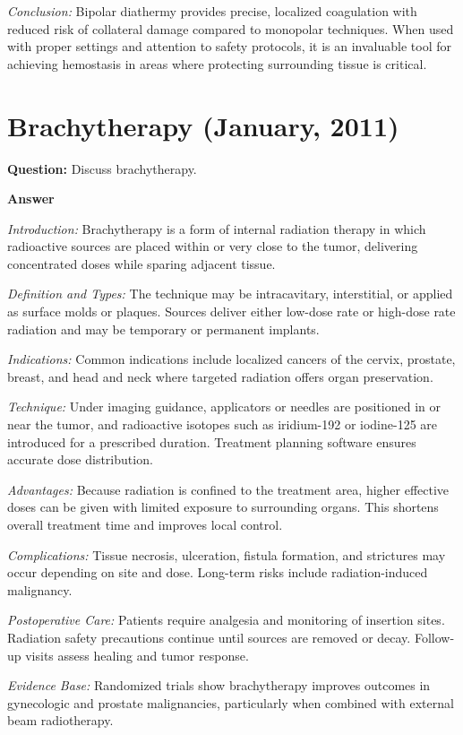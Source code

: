 \documentclass{article}
\begin{document}
\emph{Conclusion:} Bipolar diathermy provides precise, localized coagulation with reduced risk of collateral damage compared to monopolar techniques. When used with proper settings and attention to safety protocols, it is an invaluable tool for achieving hemostasis in areas where protecting surrounding tissue is critical.

\section{Brachytherapy (January, 2011)}

\textbf{Question:} Discuss brachytherapy.

\textbf{Answer}

\emph{Introduction:} Brachytherapy is a form of internal radiation therapy in which radioactive sources are placed within or very close to the tumor, delivering concentrated doses while sparing adjacent tissue.

\emph{Definition and Types:} The technique may be intracavitary, interstitial, or applied as surface molds or plaques. Sources deliver either low-dose rate or high-dose rate radiation and may be temporary or permanent implants.

\emph{Indications:} Common indications include localized cancers of the cervix, prostate, breast, and head and neck where targeted radiation offers organ preservation.

\emph{Technique:} Under imaging guidance, applicators or needles are positioned in or near the tumor, and radioactive isotopes such as iridium-192 or iodine-125 are introduced for a prescribed duration. Treatment planning software ensures accurate dose distribution.

\emph{Advantages:} Because radiation is confined to the treatment area, higher effective doses can be given with limited exposure to surrounding organs. This shortens overall treatment time and improves local control.

\emph{Complications:} Tissue necrosis, ulceration, fistula formation, and strictures may occur depending on site and dose. Long-term risks include radiation-induced malignancy.

\emph{Postoperative Care:} Patients require analgesia and monitoring of insertion sites. Radiation safety precautions continue until sources are removed or decay. Follow-up visits assess healing and tumor response.

\emph{Evidence Base:} Randomized trials show brachytherapy improves outcomes in gynecologic and prostate malignancies, particularly when combined with external beam radiotherapy.
\end{document}
